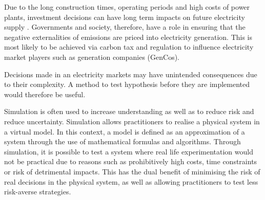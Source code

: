 


Due to the long construction times, operating periods and high costs of power plants, investment decisions can have long term impacts on future electricity supply \cite{Chappin2017}. Governments and society, therefore, have a role in ensuring that the negative externalities of emissions are priced into electricity generation. This is most likely to be achieved via carbon tax and regulation to influence electricity market players such as generation companies (GenCos).


Decisions made in an electricity markets may have unintended consequences due to their complexity. A method to test hypothesis before they are implemented would therefore be useful.

Simulation is often used to increase understanding as well as to reduce risk and reduce uncertainty. Simulation allows practitioners to realise a physical system in a virtual model. In this context, a model is defined as an approximation of a system through the use of mathematical formulas and algorithms. Through simulation, it is possible to test a system where real life experimentation would not be practical due to reasons such as prohibitively high costs, time constraints or risk of detrimental impacts. This has the dual benefit of minimising the risk of real decisions in the physical system, as well as allowing practitioners to test less risk-averse strategies.

